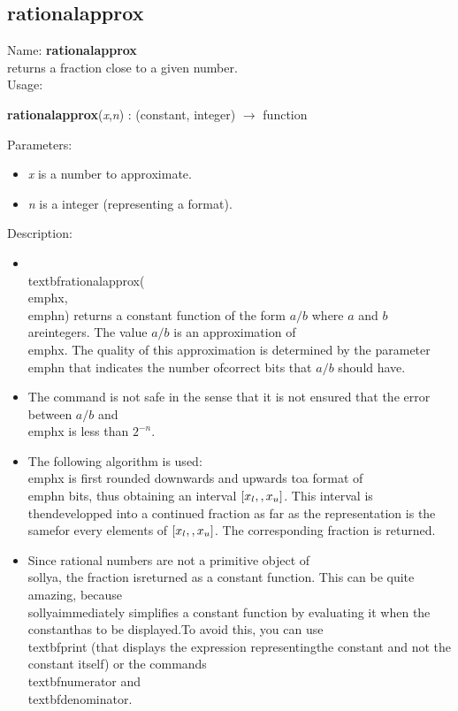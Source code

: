 \subsection{rationalapprox}
\label{labrationalapprox}
\noindent Name: \textbf{rationalapprox}\\
returns a fraction close to a given number.\\
\noindent Usage: 
\begin{center}
\textbf{rationalapprox}(\emph{x},\emph{n}) : (\textsf{constant}, \textsf{integer}) $\rightarrow$ \textsf{function}\\
\end{center}
Parameters: 
\begin{itemize}
\item \emph{x} is a number to approximate.
\item \emph{n} is a integer (representing a format).
\end{itemize}
\noindent Description: \begin{itemize}

\item \\textbf{rationalapprox}(\\emph{x},\\emph{n}) returns a constant function of the form $a/b$ where $a$ and $b$ are\n   integers. The value $a/b$ is an approximation of \\emph{x}. The quality of this \n   approximation is determined by the parameter \\emph{n} that indicates the number of\n   correct bits that $a/b$ should have.\n
\item The command is not safe in the sense that it is not ensured that the error \n   between $a/b$ and \\emph{x} is less than $2^{-n}$.\n
\item The following algorithm is used: \\emph{x} is first rounded downwards and upwards to\n   a format of \\emph{n} bits, thus obtaining an interval $[x_l,\\,x_u]$. This interval is then\n   developped into a continued fraction as far as the representation is the same\n   for every elements of $[x_l,\\,x_u]$. The corresponding fraction is returned.\n
\item Since rational numbers are not a primitive object of \\sollya, the fraction is\n   returned as a constant function. This can be quite amazing, because \\sollya\n   immediately simplifies a constant function by evaluating it when the constant\n   has to be displayed.\n   To avoid this, you can use \\textbf{print} (that displays the expression representing\n   the constant and not the constant itself) or the commands \\textbf{numerator} \n   and \\textbf{denominator}.\n\end{itemize}
